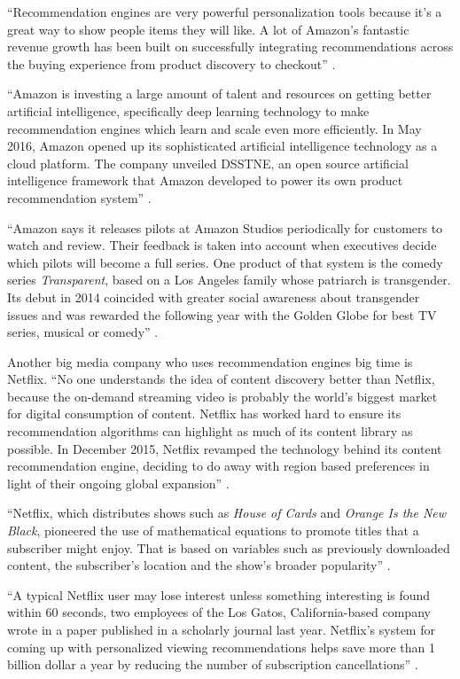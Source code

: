 \documentclass[sigconf]{acmart}
\begin{document}
``Recommendation engines are very powerful personalization tools because it's a great way to show people items they will like. A lot of Amazon's fantastic revenue growth has been built on successfully integrating recommendations across the buying experience from product discovery to checkout'' \cite{Arora2016battle}.

``Amazon is investing a large amount of talent and resources on getting better artificial intelligence, specifically deep learning technology to make recommendation engines which learn and scale even more efficiently. In May 2016, Amazon opened up its sophisticated artificial intelligence technology as a cloud platform. The company unveiled DSSTNE, an open source artificial intelligence framework that Amazon developed to power its own product recommendation system'' \cite{Arora2016battle}.

``Amazon says it releases pilots at Amazon Studios periodically for customers to watch and review. Their feedback is taken into account when executives decide which pilots will become a full series. One product of that system is the comedy series {\em Transparent}, based on a Los Angeles family whose patriarch is transgender. Its debut in 2014 coincided with greater social awareness about transgender issues and was rewarded the following year with the Golden Globe for best TV series, musical or comedy'' \cite{Whitley2016data}.

Another big media company who uses recommendation engines big time is Netflix. ``No one understands the idea of content discovery better than Netflix, because the on-demand streaming video is probably the world's biggest market for digital consumption of content. Netflix has worked hard to ensure its recommendation algorithms can highlight as much of its content library as possible. In December 2015, Netflix revamped the technology behind its content recommendation engine, deciding to do away with region based preferences in light of their ongoing global expansion'' \cite{Arora2016battle}.

``Netflix, which distributes shows such as {\em House of Cards} and {\em Orange Is the New Black}, pioneered the use of mathematical equations to promote titles that a subscriber might enjoy. That is based on variables such as previously downloaded content, the subscriber's location and the show's broader popularity'' \cite{Whitley2016data}.

``A typical Netflix user may lose interest unless something interesting is found within 60 seconds, two employees of the Los Gatos, California-based company wrote in a paper published in a scholarly journal last year. Netflix's system for coming up with personalized viewing recommendations helps save more than 1 billion dollar a year by reducing the number of subscription cancellations'' \cite{Whitley2016data}. 
\end{document}
